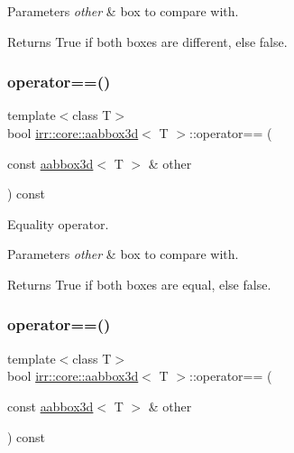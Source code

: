 \begin{DoxyParams}{Parameters}
{\em other} & box to compare with. \\
\hline
\end{DoxyParams}
\begin{DoxyReturn}{Returns}
True if both boxes are different, else false. 
\end{DoxyReturn}
\mbox{\label{classirr_1_1core_1_1aabbox3d_ac77180d63cc1726d0dec25e6f4cfd59c}} 
\subsubsection{\texorpdfstring{operator==()}{operator==()}\hspace{0.1cm}{\footnotesize\ttfamily [1/2]}}
{\footnotesize\ttfamily template$<$class T$>$ \\
bool \hyperlink{classirr_1_1core_1_1aabbox3d}{irr\+::core\+::aabbox3d}$<$ T $>$\+::operator== (\begin{DoxyParamCaption}\item[{const \hyperlink{classirr_1_1core_1_1aabbox3d}{aabbox3d}$<$ T $>$ \&}]{other }\end{DoxyParamCaption}) const\hspace{0.3cm}{\ttfamily [inline]}}



Equality operator. 


\begin{DoxyParams}{Parameters}
{\em other} & box to compare with. \\
\hline
\end{DoxyParams}
\begin{DoxyReturn}{Returns}
True if both boxes are equal, else false. 
\end{DoxyReturn}
\mbox{\label{classirr_1_1core_1_1aabbox3d_ac77180d63cc1726d0dec25e6f4cfd59c}} 
\subsubsection{\texorpdfstring{operator==()}{operator==()}\hspace{0.1cm}{\footnotesize\ttfamily [2/2]}}
{\footnotesize\ttfamily template$<$class T$>$ \\
bool \hyperlink{classirr_1_1core_1_1aabbox3d}{irr\+::core\+::aabbox3d}$<$ T $>$\+::operator== (\begin{DoxyParamCaption}\item[{const \hyperlink{classirr_1_1core_1_1aabbox3d}{aabbox3d}$<$ T $>$ \&}]{other }\end{DoxyParamCaption}) const\hspace{0.3cm}{\ttfamily [inline]}}



